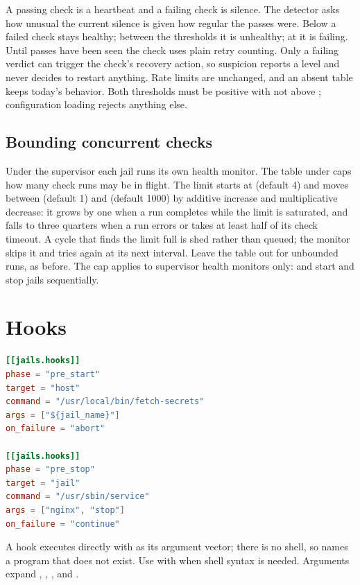 A passing check is a heartbeat and a failing check is silence. The detector asks
how unusual the current silence is given how regular the passes were. Below
 a failed check stays healthy; between the thresholds
it is unhealthy; at  it is failing. Until
 passes have been seen the check uses plain retry
counting. Only a failing verdict can trigger the check's recovery action, so
suspicion reports a level and never decides to restart anything. Rate
limits are unchanged, and an absent table keeps today's behavior. Both thresholds must be positive with
 not above ; configuration
loading rejects anything else.

\subsection*{Bounding concurrent checks}

Under the supervisor each jail runs its own health monitor. The
 table under  caps how
many check runs may be in flight. The limit starts at  (default 4) and moves
between  (default 1) and  (default 1000) by additive
increase and multiplicative decrease: it grows by one when a run completes
while the limit is saturated, and falls to three quarters when a run errors or
takes at least half of its check timeout. A cycle that finds the limit full is
shed rather than queued; the monitor skips it and tries again at its next
interval. Leave the table out for unbounded runs, as before. The cap applies to
supervisor health monitors only:  and  start and stop
jails sequentially.

\section{Hooks}

\begin{lstlisting}[language=TOML]
[[jails.hooks]]
phase = "pre_start"
target = "host"
command = "/usr/local/bin/fetch-secrets"
args = ["${jail_name}"]
on_failure = "abort"

[[jails.hooks]]
phase = "pre_stop"
target = "jail"
command = "/usr/sbin/service"
args = ["nginx", "stop"]
on_failure = "continue"
\end{lstlisting}

A hook executes  directly with  as its argument
vector; there is no shell, so  names a
program that does not exist. Use  with
 when shell syntax is needed. Arguments expand
, ,
, and .

